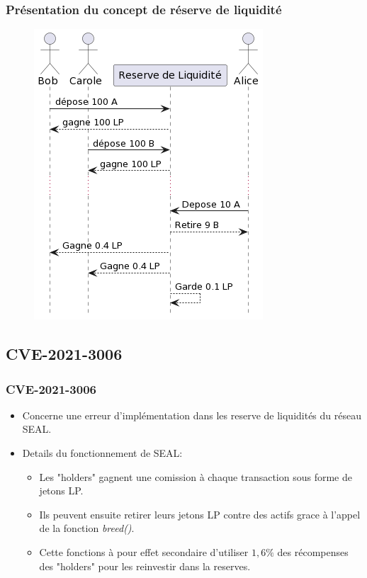 \begin{frame}
    \frametitle{Présentation du concept de réserve de liquidité}   
    \begin{figure}
        \centering
        \includegraphics[scale = 0.5]{decentralisation/reserve_liquidite_explain.png}
    \end{figure}
\end{frame}

\subsection{CVE-2021-3006}
\begin{frame}
    \frametitle{CVE-2021-3006}
    \begin{itemize}
        \item Concerne une erreur d'implémentation dans les reserve de liquidités du réseau SEAL.
        \item Details du fonctionnement de SEAL:
        \begin{itemize}
            \item Les "holders" gagnent une comission à chaque transaction sous forme de jetons LP.
            \item Ils peuvent ensuite retirer leurs jetons LP contre des actifs grace à l'appel de la fonction \textit{breed()}.
            \item Cette fonctions à pour effet secondaire d'utiliser $1,6\%$ des récompenses des "holders" pour les reinvestir dans la reserves.
        \end{itemize}
    \end{itemize}   
\end{frame}


